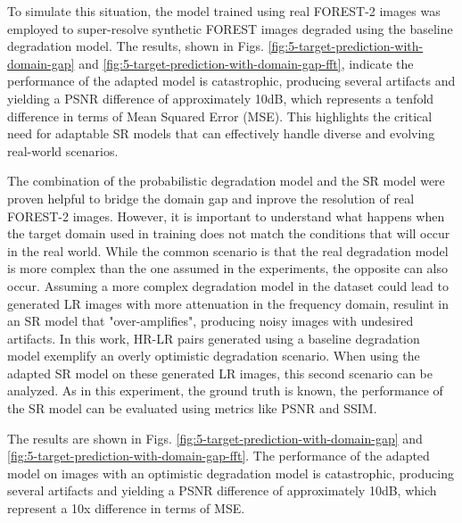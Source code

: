         To simulate this situation, the model trained using real FOREST-2 images was employed to super-resolve synthetic FOREST images degraded using the baseline degradation model. The results, shown in Figs. \ref{fig:5-target-prediction-with-domain-gap} and \ref{fig:5-target-prediction-with-domain-gap-fft}, indicate the performance of the adapted model is catastrophic, producing several artifacts and yielding a PSNR difference of approximately 10dB, which represents a tenfold difference in terms of Mean Squared Error (MSE). This highlights the critical need for adaptable SR models that can effectively handle diverse and evolving real-world scenarios.


        The combination of the probabilistic degradation model and the SR model were proven helpful to bridge the domain gap and inprove the resolution of real FOREST-2 images.
        However, it is important to understand what happens when the target domain used in training does not match the conditions that will occur in the real world.
        While the common scenario is that the real degradation model is more complex than the one assumed in the experiments, the opposite can also occur.
        Assuming a more complex degradation model in the dataset could lead to generated LR images with more attenuation in the frequency domain, resulint in an SR model that "over-amplifies", producing noisy images with undesired artifacts.
        In this work, HR-LR pairs generated using a baseline degradation model exemplify an overly optimistic degradation scenario.
        When using the adapted SR model on these generated LR images, this second scenario can be analyzed.
        As in this experiment, the ground truth is known, the performance of the SR model can be evaluated using metrics like PSNR and SSIM.
        
        The results are shown in Figs. \ref{fig:5-target-prediction-with-domain-gap} and \ref{fig:5-target-prediction-with-domain-gap-fft}.
        The performance of the adapted model on images with an optimistic degradation model is catastrophic, producing several artifacts and yielding a PSNR difference of approximately 10dB, which represent a 10x difference in terms of MSE.

